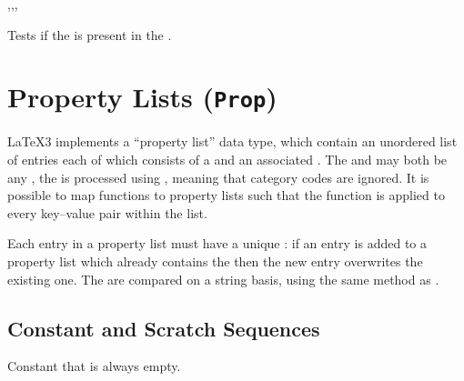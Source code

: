 \documentclass[oneside]{book}
\begin{document}
\begin{function}{\SeqVarIfIn,\SeqVarIfInT,\SeqVarIfInF,\SeqVarIfInTF}
\begin{syntax}
  
   
   
    
\end{syntax}
Tests if the  is present in the .
\begin{demohigh}
\SeqSetFromClist {}
\SeqVarIfInTF {} {} {}
\SeqVarIfInTF {} {} {}
\end{demohigh}
\end{function}

\chapter{Property Lists (\texttt{Prop})}

\LaTeX3 implements a \enquote{property list} data type, which contain
an unordered list of entries each of which consists of a  and
an associated . The  and  may both
be any , the  is processed using
, meaning that category codes are ignored. It is possible to
map functions to property lists such that the function is applied to every
key--value pair within the list.

Each entry in a property list must have a unique : if an entry is
added to a property list which already contains the  then the new
entry overwrites the existing one. The  are compared on a
string basis, using the same method as .


\section{Constant and Scratch Sequences}

\begin{variable}{\cEmptyProp}
Constant that is always empty.
\end{variable}
\end{document}
